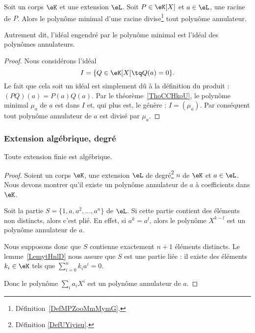 \begin{proposition}\label{PropXULooPCusvE}
	Soit un corps \( \eK\) et une extension \( \eL\). Soit \( P\in \eK[X]\) et  \( a\in \eL\), une racine de \( P\). Alors le polynôme minimal d'une racine divise\footnote{Définition~\ref{DefMPZooMmMymG}.} tout polynôme annulateur.

	Autrement dit, l'idéal engendré par le polynôme minimal est l'idéal des polynômes annulateurs.
\end{proposition}

\begin{proof}
	Nous considérons l'idéal
	\begin{equation}
		I=\{ Q\in \eK[X]\tq Q(a)=0 \}.
	\end{equation}
	Le fait que cela soit un idéal est simplement dû à la définition du produit : \( (PQ)(a)=P(a)Q(a)\). Par le théorème~\ref{ThoCCHkoU}, le polynôme minimal \( \mu_a\) de \( a\) est dans \( I\) et, qui plus est, le génère : \( I=(\mu_a)\). Par conséquent tout polynôme annulateur de \( a\) est divisé par \( \mu_a\).
\end{proof}

\subsubsection{Extension algébrique, degré}

\begin{proposition}
	Toute extension finie est algébrique.
\end{proposition}

\begin{proof}
	Soient un corps \( \eK\), une extension \( \eL\) de degré\footnote{Définition \ref{DefUYiyieu}.} \( n\) de \( \eK\) et \( a\in \eL\). Nous devons montrer qu'il existe un polynôme annulateur de \( a\) à coefficients dans \( \eK\).

	Soit la partie \( S=\{1,a,a^2,\ldots, a^n\}\) de \( \eL\). Si cette partie contient des éléments non distincts, alors c'est plié. En effet, si \( a^k=a^l\), alors le polynôme \( X^{k-l}\) est un polynôme annulateur de \( a\).

	Nous supposons donc que \( S\) contienne exactement \( n+1\) éléments distincts. Le lemme~\ref{LemytHnlD} nous assure que \( S\) est une partie liée : il existe des éléments \( k_i\in \eK\) tels que \( \sum_{i=0}^nk_ia^i=0\).

	Donc le polynôme \( \sum_ia_iX^i\) est un polynôme annulateur de \( a\).
\end{proof}

